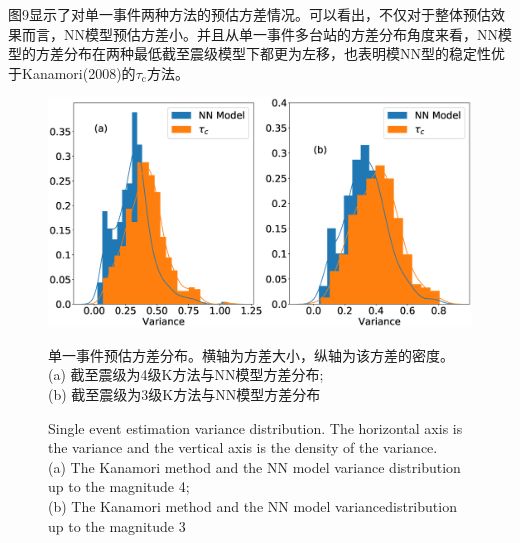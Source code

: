 \indent 图9显示了对单一事件两种方法的预估方差情况。可以看出，不仅对于整体预估效果而言，NN模型预估方差小。并且从单一事件多台站的方差分布角度来看，NN模型的方差分布在两种最低截至震级模型下都更为左移，也表明模NN型的稳定性优于Kanamori(2008)的$\tau_{\mathrm{c}}$方法。
\begin{figure}[!h] 
\centering 
 \includegraphics[width=\linewidth]{img/9.eps} 
 \renewcommand{\figurename}{图} 
\caption{单一事件预估方差分布。横轴为方差大小，纵轴为该方差的密度。\\
(a) 截至震级为4级K方法与NN模型方差分布;\\
(b) 截至震级为3级K方法与NN模型方差分布} 
\addtocounter{figure}{-1} \vspace{-5pt} 
\renewcommand{\figurename}{Fig} 
\caption{Single event estimation variance distribution. The horizontal axis is the variance and the vertical axis is the density of the variance.\\
(a) The Kanamori method and the NN model variance distribution up to the
magnitude 4; \\
(b) The Kanamori method and the NN model variancedistribution up to the magnitude 3} 
\renewcommand{\figurename}{图} 
\label{fig:network-device-influence.png} 
\end{figure}